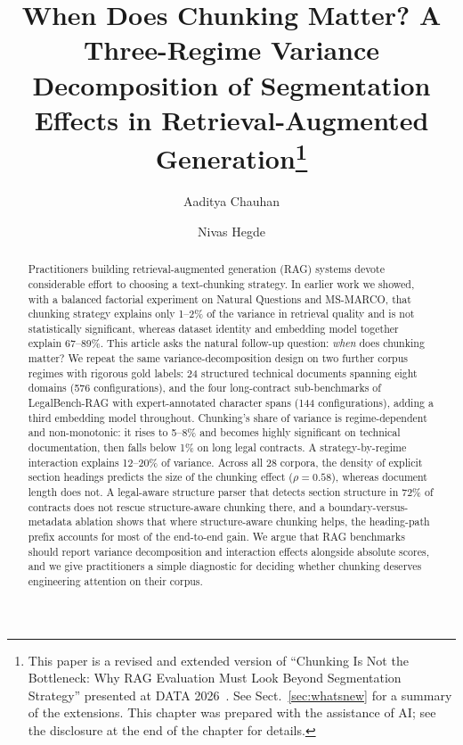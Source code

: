 \documentclass[runningheads]{llncs}
\begin{document}
\title{When Does Chunking Matter? A Three-Regime Variance Decomposition of Segmentation Effects in Retrieval-Augmented Generation\thanks{This paper is a revised and extended version of ``Chunking Is Not the Bottleneck: Why RAG Evaluation Must Look Beyond Segmentation Strategy'' presented at DATA 2026~\cite{chauhan2026chunking}. See Sect.~\ref{sec:whatsnew} for a summary of the extensions. This chapter was prepared with the assistance of AI; see the disclosure at the end of the chapter for details.}}

\author{Aaditya Chauhan \and
Nivas Hegde}

\maketitle

\begin{abstract}
Practitioners building retrieval-augmented generation (RAG) systems devote considerable effort to choosing a text-chunking strategy. In earlier work we showed, with a balanced factorial experiment on Natural Questions and MS-MARCO, that chunking strategy explains only 1--2\% of the variance in retrieval quality and is not statistically significant, whereas dataset identity and embedding model together explain 67--89\%. This article asks the natural follow-up question: \emph{when} does chunking matter? We repeat the same variance-decomposition design on two further corpus regimes with rigorous gold labels: 24 structured technical documents spanning eight domains (576 configurations), and the four long-contract sub-benchmarks of LegalBench-RAG with expert-annotated character spans (144 configurations), adding a third embedding model throughout. Chunking's share of variance is regime-dependent and non-monotonic: it rises to 5--8\% and becomes highly significant on technical documentation, then falls below 1\% on long legal contracts. A strategy-by-regime interaction explains 12--20\% of variance. Across all 28 corpora, the density of explicit section headings predicts the size of the chunking effect ($\rho = 0.58$), whereas document length does not. A legal-aware structure parser that detects section structure in 72\% of contracts does not rescue structure-aware chunking there, and a boundary-versus-metadata ablation shows that where structure-aware chunking helps, the heading-path prefix accounts for most of the end-to-end gain. We argue that RAG benchmarks should report variance decomposition and interaction effects alongside absolute scores, and we give practitioners a simple diagnostic for deciding whether chunking deserves engineering attention on their corpus.

\end{abstract}
\end{document}
